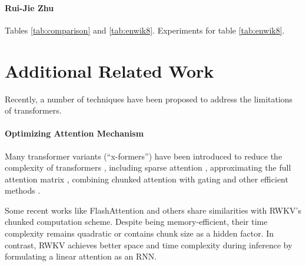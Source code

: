\documentclass[11pt]{article}
\begin{document}
\paragraph{Rui-Jie Zhu} Tables \ref{tab:comparison} and \ref{tab:enwik8}. Experiments for table \ref{tab:enwik8}. 

\section{Additional Related Work} \label{related_work}
Recently, a number of techniques have been proposed to address the limitations of transformers. 
\paragraph{Optimizing Attention Mechanism} %
Many transformer variants (``x-formers'') have been introduced to reduce the complexity of transformers \cite{tay2022efficient}, including sparse attention \cite{Beltagy2020Longformer,reformer,guo2022longt5}, approximating the full attention matrix \cite{wang2020linformer,ma2021luna,performer}, combining chunked attention with gating \cite{MEGA2023} and other efficient methods \cite{katharopoulos2020transformers,jaegle2021perceiver}. 

Some recent works like FlashAttention \cite{dao2022flashattention} and others \cite{rabe2022selfattention, jang2019mnnfast} share similarities with RWKV's chunked computation scheme. %
Despite being memory-efficient, their time complexity remains quadratic or contains chunk size as a hidden factor. In contrast, RWKV achieves better space and time complexity during inference by formulating a linear attention as an RNN.
\end{document}
